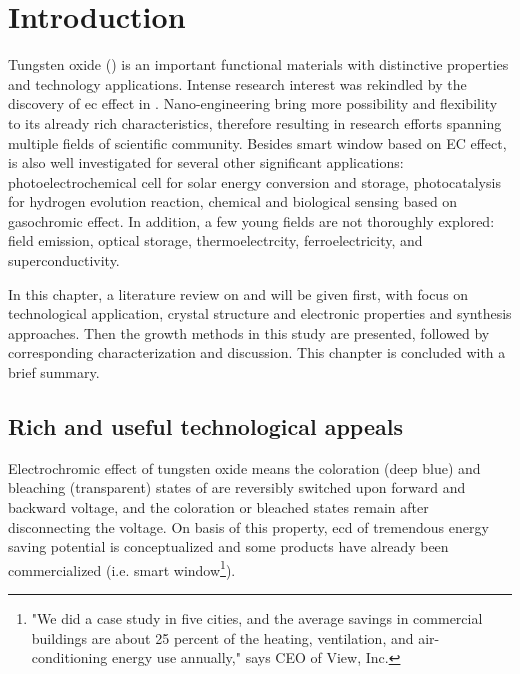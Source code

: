 
\section{Introduction}

Tungsten oxide () is an important functional materials with distinctive properties and technology applications. Intense research interest was rekindled by the discovery of \gls{ec} effect in \citeyear{Granqvist1993}.\cite{Granqvist1993}  Nano-engineering  bring more possibility and flexibility to its already rich characteristics, therefore resulting in research efforts spanning multiple fields of scientific community. Besides smart window based on EC effect,  is also well investigated for several other significant applications: photoelectrochemical cell for solar energy conversion and storage, photocatalysis for hydrogen evolution reaction, chemical and biological sensing based on gasochromic effect. In addition, a few young fields are not thoroughly explored: field emission, optical storage, thermoelectrcity, ferroelectricity, and superconductivity.

In this chapter, a literature review on  and  will be given first, with focus on technological application, crystal structure and electronic properties and synthesis approaches. Then the growth methods in this study are presented, followed by corresponding characterization and discussion. This chanpter is concluded with a brief summary.

\subsection{Rich and useful technological appeals}

Electrochromic effect of tungsten oxide means the coloration (deep blue) and bleaching (transparent) states of  are reversibly switched upon forward and backward voltage, and the coloration or bleached states remain after disconnecting the voltage. On basis of this property, \gls{ecd} of tremendous energy saving potential is conceptualized and some products have already been commercialized (i.e. smart window\footnote{"We did a case study in five cities, and the average savings in commercial buildings are about 25 percent of the heating, ventilation, and air-conditioning energy use annually," says CEO of View, Inc.}).

